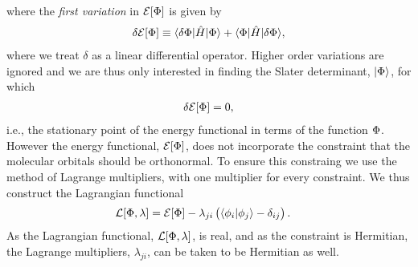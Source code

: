             where the \emph{first variation} in $\mathcal{E}[\Phi]$ is given by
            \begin{align}
                \delta\mathcal{E}[\Phi]
                \equiv
                \langle \delta\Phi |\hat{H}| \Phi \rangle + \langle \Phi |\hat{H}| \delta\Phi \rangle,
            \end{align}
            where we treat $\delta$ as a linear differential operator.
            Higher order variations are ignored and we are thus only interested in
            finding the Slater determinant, $| \Phi \rangle$, for which
            \begin{align}
                \delta\mathcal{E}[\Phi] = 0,
            \end{align}
            i.e., the stationary point of the energy functional in terms of the
            function $\Phi$.
            However the energy functional, $\mathcal{E}[\Phi]$, does not
            incorporate the constraint that the molecular orbitals should be
            orthonormal.
            To ensure this constraing we use the method of Lagrange multipliers,
            with one multiplier for every constraint.
            We thus construct the Lagrangian functional
            \begin{align}
                \mathcal{L}[\Phi, \lambda]
                &= \mathcal{E}[\Phi]
                - \lambda_{ji}\left( 
                    \langle \phi_i | \phi_j \rangle
                    - \delta_{ij}
                 \right).
            \end{align}
            As the Lagrangian functional, $\mathcal{L}[\Phi, \lambda]$, is
            real, and as the constraint is Hermitian, the Lagrange multipliers,
            $\lambda_{ji}$, can be taken to be Hermitian as well.

